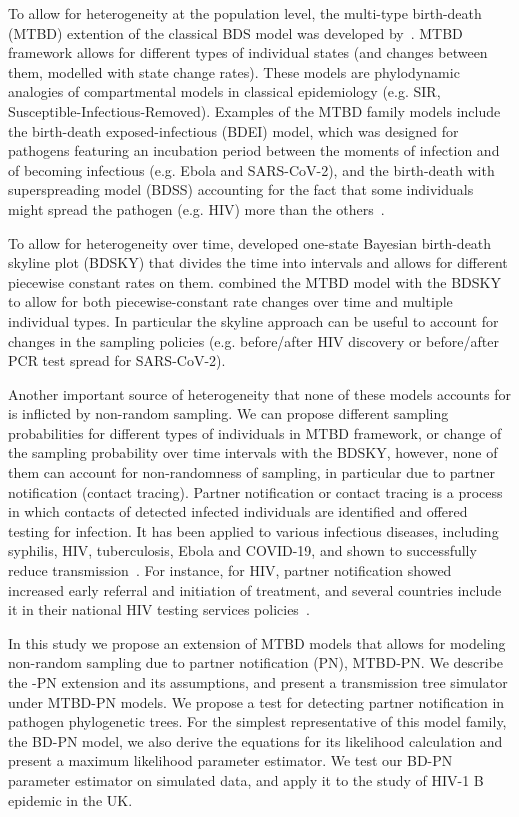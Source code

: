 \documentclass[a4paper,10pt]{article}
\begin{document}
To allow for heterogeneity at the population level, the multi-type birth-death (MTBD) extention of the classical BDS model was developed by~\citet{Stadler2013a}. MTBD framework allows for different types of individual states (and changes between them, modelled with state change rates). These models are phylodynamic analogies of compartmental models in classical epidemiology (e.g. SIR, Susceptible-Infectious-Removed).  Examples of the MTBD family models include the birth-death exposed-infectious (BDEI) model, which was designed for pathogens featuring an incubation period between the moments of infection and of becoming infectious (e.g. Ebola and SARS-CoV-2), and the birth-death with superspreading model (BDSS) accounting for the fact that some individuals might spread the pathogen (e.g. HIV) more than the others~\citep{Stadler2014}.

To allow for heterogeneity over time, \citet{Stadler2013} developed one-state Bayesian birth-death skyline plot (BDSKY) that divides the time into intervals and allows for different piecewise constant rates on them. \citet{Kuhnert2016} combined the MTBD model with the BDSKY to allow for both piecewise-constant rate changes over time and multiple individual types. In particular the skyline approach can be useful to account for changes in the sampling policies (e.g. before/after HIV discovery or before/after PCR test spread for SARS-CoV-2).


Another important source of heterogeneity that none of these models accounts for is inflicted by non-random sampling. We can propose different sampling probabilities for different types of individuals in MTBD framework, or change of the sampling probability over time intervals with the BDSKY, however, none of them can account for non-randomness of sampling, in particular due to partner notification (contact tracing). Partner notification or contact tracing is a process in which contacts of detected infected individuals are identified and offered testing for infection. It has been applied to various infectious diseases, including syphilis, HIV, tuberculosis, Ebola and COVID-19, and shown to successfully reduce transmission~\citep{el-sadrContactTracingBarriers2022}. For instance, for HIV,  partner notification showed increased early referral and initiation of treatment, and several countries include it in their national HIV testing services policies~\citep{worldhealthorganizationCountryPolicyReview2016}. 


In this study we propose an extension of MTBD models that allows for modeling non-random sampling due to partner notification (PN), MTBD-PN. We describe the -PN extension and its assumptions, and present a transmission tree simulator under MTBD-PN models. We propose a test for detecting partner notification in pathogen phylogenetic trees. For the simplest representative of this model family, the BD-PN model, we also derive the equations for its likelihood calculation and present a maximum likelihood parameter estimator. We test our BD-PN parameter estimator on simulated data, and apply it to the study of HIV-1 B epidemic in the UK. 
\end{document}
